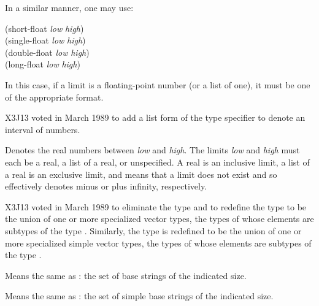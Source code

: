 \begin{flushdesc}
In a similar manner, one may use:
\begin{lisp}
(short-float \emph{low} \emph{high}) \\
(single-float \emph{low} \emph{high}) \\
(double-float \emph{low} \emph{high}) \\
(long-float \emph{low} \emph{high})
\end{lisp}
In this case, if a limit is a floating-point
number (or a list of one), it must be one of the appropriate format.
\end{flushdesc}

\begin{newer}
X3J13 voted in March 1989  to add a list form of the 
type specifier to denote an interval of  numbers.

\begin{flushdesc}
\item[\cd{(real \emph{low} \emph{high})}]
Denotes the real numbers between
\emph{low} and \emph{high}.  The limits \emph{low} and \emph{high}
must each be a real, a list of a real, or unspecified.
A real is an inclusive limit,
a list of a real is an exclusive limit, and
\cdf{*} means that a limit does not exist
and so effectively denotes minus or plus infinity, respectively.
\end{flushdesc}
\end{newer}

\begin{newer}
X3J13 voted in March 1989 
to eliminate the type  and to redefine the type
 to be the union of one or more specialized vector
types, the types of whose elements are subtypes of the type .
Similarly, the type
 is redefined to be the union of one or more specialized
simple vector
types, the types of whose elements are subtypes of the type .

\begin{flushdesc}
\item[\cd{(base-string \emph{size})}]
Means the same as
: the set of base
strings of the indicated size.

\item[\cd{(simple-base-string \emph{size})}]
Means the same
as : the set of simple base
strings of the indicated size.
\end{flushdesc}
\end{newer}

